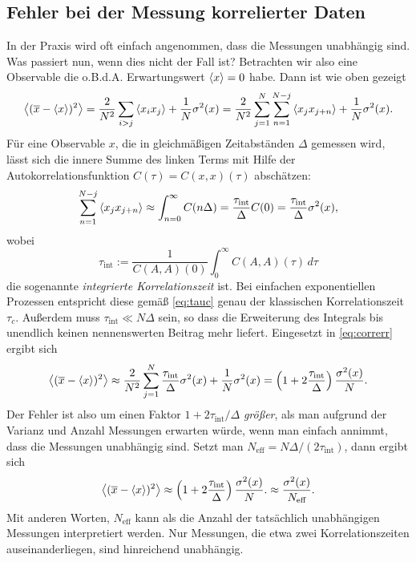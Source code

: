 \subsection{Fehler bei der Messung korrelierter Daten}

In der Praxis wird oft einfach angenommen, dass die Messungen
unabhängig sind. Was passiert nun, wenn dies nicht der Fall ist?
Betrachten wir also eine Observable die o.B.d.A. Erwartungswert
$\left\langle{x}\right\rangle = 0$ habe. Dann ist wie oben gezeigt
\begin{equation}
  \label{eq:correrr}
  \left\langle{(\overline{x} - \left\langle{x}\right\rangle)^2}\right\rangle = \frac{2}{N^2}\sum_{i > j}
  \left\langle{x_ix_j}\right\rangle
  + \frac{1}{N}\sigma^2(x)
  = \frac{2}{N^2}\sum_{j=1}^{N}\sum_{n = 1}^{N-j} \left\langle{x_jx_{j+n}}\right\rangle
  + \frac{1}{N}\sigma^2(x).
\end{equation}
Für eine Observable $x$, die in gleichmäßigen Zeitabständen $\Delta$
gemessen wird, lässt sich die innere Summe des linken Terms mit Hilfe
der Autokorrelationsfunktion $C(\tau) = C(x,x)(\tau)$
abschätzen:\nobreak
\begin{equation}
  \sum_{n = 1}^{N-j} \left\langle{x_jx_{j+n}}\right\rangle
  \approx \int_{n = 0}^{\infty} C(n\Delta)
  = \frac{\tau_\text{int}}{\Delta} C(0)
  = \frac{\tau_\text{int}}{\Delta}\sigma^2(x),
\end{equation}
wobei
\begin{equation}
  \tau_\text{int} := \frac{1}{C(A,A)(0)}\int_0^\infty C(A,A)(\tau)\,d\tau
\end{equation}
die sogenannte \emph{integrierte
  Korrelationszeit}
ist. Bei einfachen exponentiellen Prozessen entspricht diese gemäß
\eqref{eq:tauc} genau der klassischen Korrelationszeit
$\tau_c$. Außerdem muss $\tau_\text{int}\ll N\Delta$ sein, so dass die
Erweiterung des Integrals bis unendlich keinen nennenswerten Beitrag
mehr liefert. Eingesetzt in \eqref{eq:correrr} ergibt sich
\begin{equation}
  \label{eq:correrrest}
  \left\langle{(\overline{x} - \left\langle{x}\right\rangle)^2}\right\rangle
  \approx
  \frac{2}{N^2}\sum_{j=1}^{N} \frac{\tau_\text{int}}{\Delta}\sigma^2(x)
  + \frac{1}{N}\sigma^2(x)
  =
  \left(1 + 2\frac{\tau_\text{int}}{\Delta}\right)\frac{\sigma^2(x)}{N}.
\end{equation}
Der Fehler ist also um einen Faktor $1 + 2 \tau_\text{int} /\Delta$
\emph{größer}, als man aufgrund der Varianz und Anzahl Messungen
erwarten würde, wenn man einfach annimmt, dass die Messungen
unabhängig sind. Setzt man $N_\text{eff} = N \Delta / (2\tau_\text{int})$, dann
ergibt sich
\begin{equation}
  \label{eq:errestvarcorr}
  \left\langle{(\overline{x} - \left\langle{x}\right\rangle)^2}\right\rangle
  \approx
  \left(1 + 2\frac{\tau_\text{int}}{\Delta}\right)\frac{\sigma^2(x)}{N}.
  \approx \frac{\sigma^2(x)}{N_\text{eff}}.
\end{equation}
Mit anderen Worten, $N_\text{eff}$ kann als die Anzahl der tatsächlich
unabhängigen Messungen interpretiert werden. Nur Messungen, die etwa
zwei Korrelationszeiten auseinanderliegen, sind hinreichend
unabhängig.

